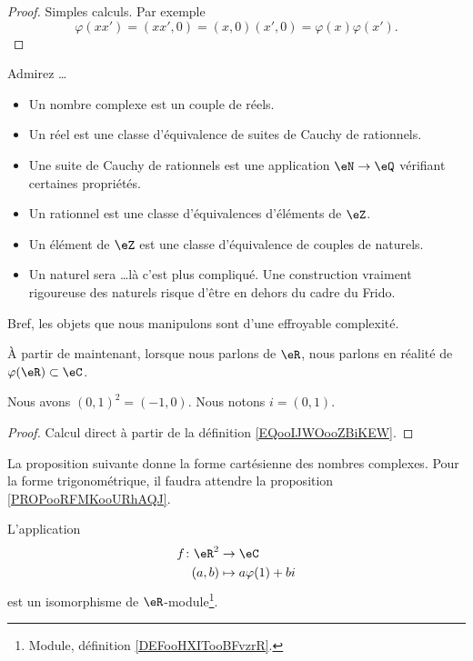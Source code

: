 \begin{proof}
	Simples calculs. Par exemple
	\begin{equation}
		\varphi(xx')=(xx',0)=(x,0)(x',0)=\varphi(x)\varphi(x').
	\end{equation}
\end{proof}

\begin{normaltext}
	Admirez \ldots
	\begin{itemize}
		\item Un nombre complexe est un couple de réels.
		\item Un réel est une classe d'équivalence de suites de Cauchy de rationnels.
		\item Une suite de Cauchy de rationnels est une application \( \eN\to \eQ\) vérifiant certaines propriétés.
		\item Un rationnel est une classe d'équivalences d'éléments de \( \eZ\).
		\item Un élément de \( \eZ\) est une classe d'équivalence de couples de naturels.
		\item Un naturel sera \ldots là c'est plus compliqué. Une construction vraiment rigoureuse des naturels risque d'être en dehors du cadre du Frido.
	\end{itemize}
	Bref, les objets que nous manipulons sont d'une effroyable complexité.
\end{normaltext}

\begin{normaltext}
	À partir de maintenant, lorsque nous parlons de \( \eR\), nous parlons en réalité de \( \varphi(\eR)\subset \eC\).
\end{normaltext}

\begin{lemma}
	Nous avons \( (0,1)^2=(-1,0)\). Nous notons \( i=(0,1)\).
\end{lemma}

\begin{proof}
	Calcul direct à partir de la définition \ref{EQooIJWOooZBiKEW}.
\end{proof}


La proposition suivante donne la forme cartésienne des nombres complexes. Pour la forme trigonométrique, il faudra attendre la proposition \ref{PROPooRFMKooURhAQJ}.
\begin{proposition}     \label{PROPooKQHLooMFxNLe}
	L'application
	\begin{equation}
		\begin{aligned}
			f\colon \eR^2 & \to \eC                \\
			(a,b)         & \mapsto a\varphi(1)+bi
		\end{aligned}
	\end{equation}
	est un isomorphisme de \( \eR\)-module\footnote{Module, définition \ref{DEFooHXITooBFvzrR}.}.
\end{proposition}


